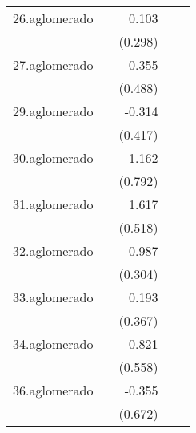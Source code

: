 {\begin{longtable}{l*{4}{D{.}{.}{-1}}}
\addlinespace
26.aglomerado&                     &       0.103         &                     &                     \\
            &                     &     (0.298)         &                     &                     \\
\addlinespace
27.aglomerado&                     &       0.355         &                     &                     \\
            &                     &     (0.488)         &                     &                     \\
\addlinespace
29.aglomerado&                     &      -0.314         &                     &                     \\
            &                     &     (0.417)         &                     &                     \\
\addlinespace
30.aglomerado&                     &       1.162         &                     &                     \\
            &                     &     (0.792)         &                     &                     \\
\addlinespace
31.aglomerado&                     &       1.617\sym{**} &                     &                     \\
            &                     &     (0.518)         &                     &                     \\
\addlinespace
32.aglomerado&                     &       0.987\sym{**} &                     &                     \\
            &                     &     (0.304)         &                     &                     \\
\addlinespace
33.aglomerado&                     &       0.193         &                     &                     \\
            &                     &     (0.367)         &                     &                     \\
\addlinespace
34.aglomerado&                     &       0.821         &                     &                     \\
            &                     &     (0.558)         &                     &                     \\
\addlinespace
36.aglomerado&                     &      -0.355         &                     &                     \\
            &                     &     (0.672)         &                     &                     \\

\end{longtable}}

